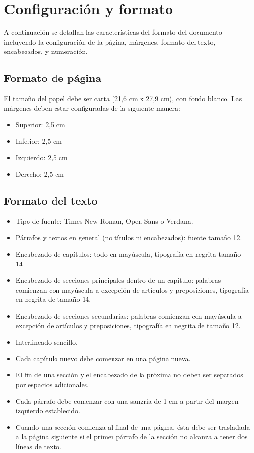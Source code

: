 \chapter{Configuración y formato}
A continuación se detallan las características del formato del documento incluyendo la configuración de la página, márgenes, formato del texto, encabezados, y numeración. 

\section{Formato de página}

El tamaño del papel debe ser carta (21,6 cm x 27,9 cm), con fondo blanco. Las márgenes deben estar configuradas de la siguiente manera:

\begin{itemize}
    \item Superior: 2,5 cm
    \item Inferior: 2,5 cm
    \item Izquierdo: 2,5 cm
    \item Derecho: 2,5 cm
\end{itemize} 

\section{Formato del texto}
\begin{itemize}
    \item Tipo de fuente: Times New Roman, Open Sans o Verdana.
    \item Párrafos y textos en general (no títulos ni encabezados): fuente tamaño 12.
    \item Encabezado de capítulos: todo en mayúscula, tipografía en negrita tamaño 14.
    \item Encabezado de secciones principales dentro de un capítulo: palabras comienzan con mayúscula a excepción de artículos y preposiciones, tipografía en negrita de tamaño 14.
    \item Encabezado de secciones secundarias: palabras comienzan con mayúscula a excepción de artículos y preposiciones, tipografía en negrita de tamaño 12.
    \item Interlineado sencillo.
    \item Cada capítulo nuevo debe comenzar en una página nueva.
    \item El fin de una sección y el encabezado de la próxima no deben ser separados por espacios adicionales.
    \item Cada párrafo debe comenzar con una sangría de 1 cm a partir del margen izquierdo establecido.
    \item Cuando una sección comienza al final de una página, ésta debe ser trasladada a la página siguiente si el primer párrafo de la sección no alcanza a tener dos líneas de texto.
\end{itemize}

